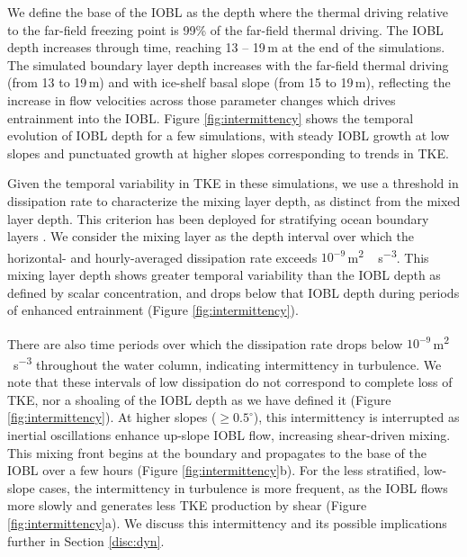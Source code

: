\documentclass[tc, manuscript]{copernicus}
\begin{document}
We define the base of the IOBL as the depth where the thermal driving relative to the far-field freezing point is 99\% of the far-field thermal driving. The IOBL depth increases through time, reaching 13 -- 19\,\unit{m} at the end of the simulations. The simulated boundary layer depth increases with the far-field thermal driving (from 13 to 19\,\unit{m}) and with ice-shelf basal slope (from 15 to 19\,\unit{m}), reflecting the increase in flow velocities across those parameter changes which drives entrainment into the IOBL. Figure \ref{fig:intermittency} shows the temporal evolution of IOBL depth for a few simulations, with steady IOBL growth at low slopes and punctuated growth at higher slopes corresponding to trends in TKE.

Given the temporal variability in TKE in these simulations, we use a threshold in dissipation rate to characterize the mixing layer depth, as distinct from the mixed layer depth. This criterion has been deployed for stratifying ocean boundary layers \citep{franks_has_2015, sutherland_mixed_2014}. We consider the mixing layer as the depth interval over which the horizontal- and hourly-averaged dissipation rate exceeds $10^{-9}$\,\unit{m^2\,s^{-3}}. This mixing layer depth shows greater temporal variability than the IOBL depth as defined by scalar concentration, and drops below that IOBL depth during periods of enhanced entrainment (Figure \ref{fig:intermittency}). 

There are also time periods over which the dissipation rate drops below $10^{-9}$\,\unit{m^2\,s^{-3}} throughout the water column, indicating intermittency in turbulence. We note that these intervals of low dissipation do not correspond to complete loss of TKE, nor a shoaling of the IOBL depth as we have defined it (Figure \ref{fig:intermittency}). At higher slopes ($\geq 0.5^{\circ}$), this intermittency is interrupted as inertial oscillations enhance up-slope IOBL flow, increasing shear-driven mixing. This mixing front begins at the boundary and propagates to the base of the IOBL over a few hours (Figure \ref{fig:intermittency}b). For the less stratified, low-slope cases, the intermittency in turbulence is more frequent, as the IOBL flows more slowly and generates less TKE production by shear (Figure \ref{fig:intermittency}a). We discuss this intermittency and its possible implications further in Section \ref{disc:dyn}.
\end{document}
